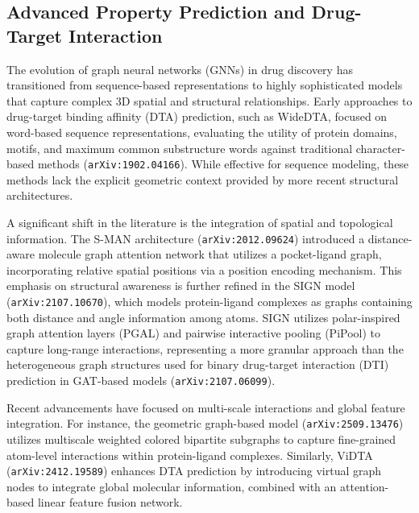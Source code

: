 \documentclass[11pt]{article}
\begin{document}
\subsection{Advanced Property Prediction and Drug-Target Interaction}

The evolution of graph neural networks (GNNs) in drug discovery has transitioned from sequence-based representations to highly sophisticated models that capture complex 3D spatial and structural relationships. Early approaches to drug-target binding affinity (DTA) prediction, such as WideDTA, focused on word-based sequence representations, evaluating the utility of protein domains, motifs, and maximum common substructure words against traditional character-based methods (\texttt{arXiv:1902.04166}). While effective for sequence modeling, these methods lack the explicit geometric context provided by more recent structural architectures.

A significant shift in the literature is the integration of spatial and topological information. The S-MAN architecture (\texttt{arXiv:2012.09624}) introduced a distance-aware molecule graph attention network that utilizes a pocket-ligand graph, incorporating relative spatial positions via a position encoding mechanism. This emphasis on structural awareness is further refined in the SIGN model (\texttt{arXiv:2107.10670}), which models protein-ligand complexes as graphs containing both distance and angle information among atoms. SIGN utilizes polar-inspired graph attention layers (PGAL) and pairwise interactive pooling (PiPool) to capture long-range interactions, representing a more granular approach than the heterogeneous graph structures used for binary drug-target interaction (DTI) prediction in GAT-based models (\texttt{arXiv:2107.06099}).

Recent advancements have focused on multi-scale interactions and global feature integration. For instance, the geometric graph-based model (\texttt{arXiv:2509.13476}) utilizes multiscale weighted colored bipartite subgraphs to capture fine-grained atom-level interactions within protein-ligand complexes. Similarly, ViDTA (\texttt{arXiv:2412.19589}) enhances DTA prediction by introducing virtual graph nodes to integrate global molecular information, combined with an attention-based linear feature fusion network.
\end{document}
